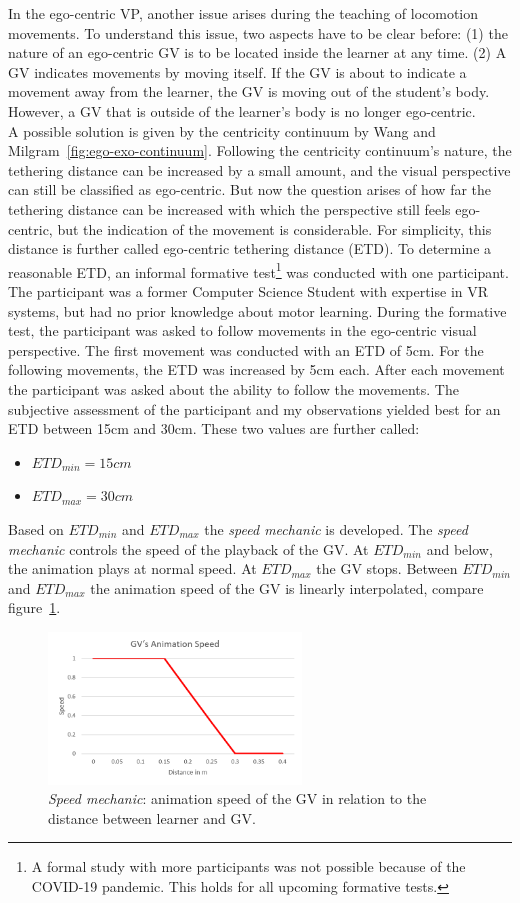 In the ego-centric VP, another issue arises during the teaching of locomotion movements. To understand this issue, two aspects have to be clear before: (1) the nature of an ego-centric GV is to be located inside the learner at any time. (2) A GV indicates movements by moving itself. If the GV is about to indicate a movement away from the learner, the GV is moving out of the student's body. However, a GV that is outside of the learner's body is no longer ego-centric.\\
A possible solution is given by the centricity continuum by Wang and Milgram~\ref{fig:ego-exo-continuum}. Following the centricity continuum's nature, the tethering distance can be increased by a small amount, and the visual perspective can still be classified as ego-centric. But now the question arises of how far the tethering distance can be increased with which the perspective still feels ego-centric, but the indication of the movement is considerable. For simplicity, this distance is further called ego-centric tethering distance (ETD). To determine a reasonable ETD, an informal formative test\footnote{A formal study with more participants was not possible because of the COVID-19 pandemic. This holds for all upcoming formative tests.} was conducted with one participant. The participant was a former Computer Science Student with expertise in VR systems, but had no prior knowledge about motor learning. During the formative test, the participant was asked to follow movements in the ego-centric visual perspective. The first movement was conducted with an ETD of 5cm. For the following movements, the ETD was increased by 5cm each. After each movement the participant was asked about the ability to follow the movements. The subjective assessment of the participant and my observations yielded best for an ETD between 15cm and 30cm. These two values are further called:
\begin{itemize}
	\item[] $ETD_{min}=15cm$
	\item[] $ETD_{max}=30cm$
\end{itemize}
Based on $ETD_{min}$ and $ETD_{max}$ the \textit{speed mechanic} is developed. The \textit{speed mechanic} controls the speed of the playback of the GV. At $ETD_{min}$ and below, the animation plays at normal speed. At $ETD_{max}$ the GV stops. Between $ETD_{min}$ and $ETD_{max}$ the animation speed of the GV is linearly interpolated, compare figure~\ref{fig:speed_mechanic}.
\begin{figure}[htb]
	\centering
	\includegraphics[width=0.6\textwidth]{figures/speed_mechanic_chart.png}
	\caption[Animation speed for the \textit{Speed mechanic}]{\textit{Speed mechanic}: animation speed of the GV in relation to the distance between learner and GV.}
	\label{fig:speed_mechanic}
\end{figure}
